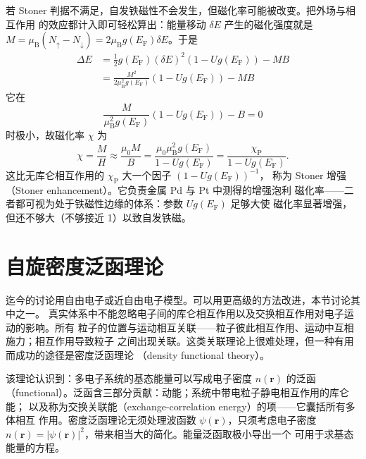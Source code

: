 若 Stoner 判据不满足，自发铁磁性不会发生，但磁化率可能被改变。把外场与相互作用
的效应都计入即可轻松算出：能量移动 $\delta E$ 产生的磁化强度就是
$M=\mu_{\mathrm{B}}(N_{\uparrow}-N_{\downarrow})=2\mu_{\mathrm{B}}g(E_{\mathrm{F}})\delta E$。于是
\begin{align*}
\Delta E &= \frac{1}{2}g(E_{\mathrm{F}})(\delta E)^{2}(1-Ug(E_{\mathrm{F}})) - MB\tag{7.30}\\
&= \frac{M^{2}}{2\mu_{\mathrm{B}}^{2}g(E_{\mathrm{F}})}(1-Ug(E_{\mathrm{F}})) - MB\tag{7.31}
\end{align*}
它在
\begin{equation*}
\frac{M}{\mu_{\mathrm{B}}^{2}g(E_{\mathrm{F}})}(1-Ug(E_{\mathrm{F}})) - B = 0\tag{7.32}
\end{equation*}
时极小，故磁化率 $\chi$ 为
\begin{equation*}
\chi = \frac{M}{H}\approx\frac{\mu_0M}{B} = \frac{\mu_0\mu_{\mathrm{B}}^{2}g(E_{\mathrm{F}})}{1-Ug(E_{\mathrm{F}})} = \frac{\chi_{\mathrm{P}}}{1-Ug(E_{\mathrm{F}})}.\tag{7.33}
\end{equation*}
这比无库仑相互作用的 $\chi_{\mathrm{P}}$ 大一个因子 $(1-Ug(E_{\mathrm{F}}))^{-1}$，
称为 Stoner 增强（Stoner enhancement）。它负责金属 Pd 与 Pt 中测得的增强泡利
磁化率——二者都可视为处于铁磁性边缘的体系：参数 $Ug(E_{\mathrm{F}})$ 足够大使
磁化率显著增强，但还不够大（不够接近 1）以致自发铁磁。

\section{自旋密度泛函理论}

迄今的讨论用自由电子或近自由电子模型。可以用更高级的方法改进，本节讨论其中之一。
真实体系中不能忽略电子间的库仑相互作用以及交换相互作用对电子运动的影响。所有
粒子的位置与运动相互关联——粒子彼此相互作用、运动中互相施力；相互作用导致粒子
之间出现关联。这类关联理论上很难处理，但一种有用而成功的途径是密度泛函理论
（density functional theory）。

该理论认识到：多电子系统的基态能量可以写成电子密度 $n(\mathbf{r})$ 的泛函
（functional）。泛函含三部分贡献：动能；系统中带电粒子静电相互作用的库仑能；
以及称为交换关联能（exchange-correlation energy）的项——它囊括所有多体相互
作用。密度泛函理论无须处理波函数 $\psi(\mathbf{r})$，只须考虑电子密度
$n(\mathbf{r})=|\psi(\mathbf{r})|^{2}$，带来相当大的简化。能量泛函取极小导出一个
可用于求基态能量的方程。

